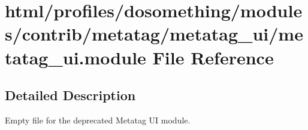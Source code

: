 \hypertarget{metatag__ui_8module}{
\section{html/profiles/dosomething/modules/contrib/metatag/metatag\_\-ui/metatag\_\-ui.module File Reference}
\label{metatag__ui_8module}
}


\subsection{Detailed Description}
Empty file for the deprecated Metatag UI module. 